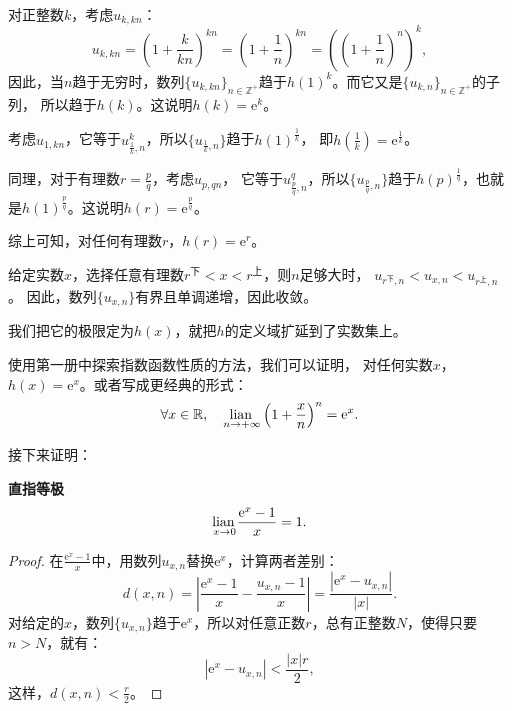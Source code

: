 \documentclass[12pt,UTF8,fontset=none]{ctexbook}
\begin{document}
\begin{appendix}
对正整数$k$，考虑$u_{k,kn}$：
$$ u_{k,kn} = \left(1 + \frac{k}{kn}\right)^{kn} = \left(1 + \frac{1}{n}\right)^{kn} = \left(\left(1 + \frac{1}{n}\right)^{n}\right)^{k}, $$
因此，当$n$趋于无穷时，数列$\{u_{k,kn}\}_{n\in\mathbb{Z}^+}$趋于$h(1)^k$。而它又是$\{u_{k,n}\}_{n\in\mathbb{Z}^+}$的子列，
所以趋于$h(k)$。这说明$h(k) = \mathrm{e}^k$。

考虑$u_{1,kn}$，它等于$u_{\frac{1}{k},n}^k$，所以$\{u_{\frac{1}{k},n}\}$趋于$h(1)^{\frac{1}{k}}$，
即$h(\frac{1}{k}) = \mathrm{e}^{\frac{1}{k}}$。

同理，对于有理数$r = \frac{p}{q}$，考虑$u_{p,qn}$，
它等于$u_{\frac{p}{q},n}^q$，所以$\{u_{\frac{p}{q},n}\}$趋于$h(p)^{\frac{1}{q}}$，也就是$h(1)^{\frac{p}{q}}$。这说明$h(r) = \mathrm{e}^{\frac{p}{q}}$。

综上可知，对任何有理数$r$，$h(r) = \mathrm{e}^r$。

给定实数$x$，选择任意有理数$r^{\text{下}} < x < r^{\text{上}}$，则$n$足够大时，
$u_{r^\text{下},n} < u_{x,n} < u_{r^\text{上},n}$。
因此，数列$\{u_{x,n}\}$有界且单调递增，因此收敛。

我们把它的极限定为$h(x)$，就把$h$的定义域扩延到了实数集上。

使用第一册中探索指数函数性质的方法，我们可以证明，
对任何实数$x$，$h(x) = \mathrm{e}^x$。或者写成更经典的形式：
$$ \forall x\in \mathbb{R}, \quad \underset{n\to +\infty}{\operatorname{lian}\,}  \left(1 + \frac{x}{n}\right)^n = \mathrm{e}^x. $$

接下来证明：
\begin{tm}{\textbf{直指等极}}\label{tm:b-1-50}
    $$\underset{x\to 0}{\operatorname{lian}\,} \frac{\mathrm{e}^x - 1}{x} = 1.$$
\end{tm}

\begin{proof}
    在$\frac{\mathrm{e}^x - 1}{x}$中，用数列$u_{x,n}$替换$\mathrm{e}^x$，计算两者差别：
    $$ d(x, n) = \left|\frac{\mathrm{e}^x - 1}{x} - \frac{u_{x,n} - 1}{x}\right| = \frac{\left|\mathrm{e}^x - u_{x,n}\right|}{\left|x\right|}. $$
    对给定的$x$，数列$\{u_{x,n}\}$趋于$\mathrm{e}^x$，所以对任意正数$r$，总有正整数$N$，使得只要$n>N$，就有：
    $$ \left|\mathrm{e}^x - u_{x,n}\right| < \frac{|x|r}{2},$$
    这样，$d(x, n) < \frac{r}{2}$。


\end{proof}
\end{appendix}
\end{document}
